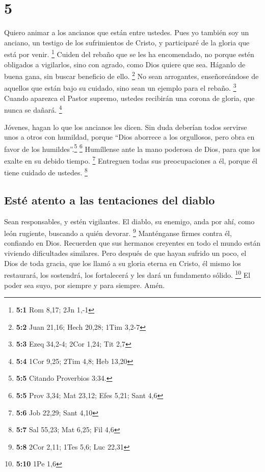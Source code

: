 \hypertarget{section-4}{%
\section{5}\label{section-4}}

 Quiero animar a los ancianos que están entre ustedes.
Pues yo también soy un anciano, un testigo de los sufrimientos de
Cristo, y participaré de la gloria que está por venir. \footnote{\textbf{5:1}
  Rom 8,17; 2Jn 1,-1}  Cuiden del rebaño que se les ha
encomendado, no porque estén obligados a vigilarlos, sino con agrado,
como Dios quiere que sea. Háganlo de buena gana, sin buscar beneficio de
ello. \footnote{\textbf{5:2} Juan 21,16; Hech 20,28; 1Tim 3,2-7}
 No sean arrogantes, enseñoreándose de aquellos que están
bajo su cuidado, sino sean un ejemplo para el rebaño. \footnote{\textbf{5:3}
  Ezeq 34,2-4; 2Cor 1,24; Tit 2,7}  Cuando aparezca el
Pastor supremo, ustedes recibirán una corona de gloria, que nunca se
dañará. \footnote{\textbf{5:4} 1Cor 9,25; 2Tim 4,8; Heb 13,20}

 Jóvenes, hagan lo que los ancianos les dicen. Sin duda
deberían todos servirse unos a otros con humildad, porque ``Dios
aborrece a los orgullosos, pero obra en favor de los
humildes''.\footnote{\textbf{5:5} Citando Proverbios 3:34.} \footnote{\textbf{5:5}
  Prov 3,34; Mat 23,12; Efes 5,21; Sant 4,6}  Humíllense
ante la mano poderosa de Dios, para que los exalte en su debido tiempo.
\footnote{\textbf{5:6} Job 22,29; Sant 4,10}  Entreguen
todas sus preocupaciones a él, porque él tiene cuidado de ustedes.
\footnote{\textbf{5:7} Sal 55,23; Mat 6,25; Fil 4,6}

\hypertarget{estuxe9-atento-a-las-tentaciones-del-diablo}{%
\subsection{Esté atento a las tentaciones del
diablo}\label{estuxe9-atento-a-las-tentaciones-del-diablo}}

 Sean responsables, y estén vigilantes. El diablo, su
enemigo, anda por ahí, como león rugiente, buscando a quién devorar.
\footnote{\textbf{5:8} 2Cor 2,11; 1Tes 5,6; Luc 22,31} 
Manténganse firmes contra él, confiando en Dios. Recuerden que sus
hermanos creyentes en todo el mundo están viviendo dificultades
similares.  Pero después de que hayan sufrido un poco, el
Dios de toda gracia, que los llamó a su gloria eterna en Cristo, él
mismo los restaurará, los sostendrá, los fortalecerá y les dará un
fundamento sólido. \footnote{\textbf{5:10} 1Pe 1,6}  El
poder sea suyo, por siempre y para siempre. Amén.

